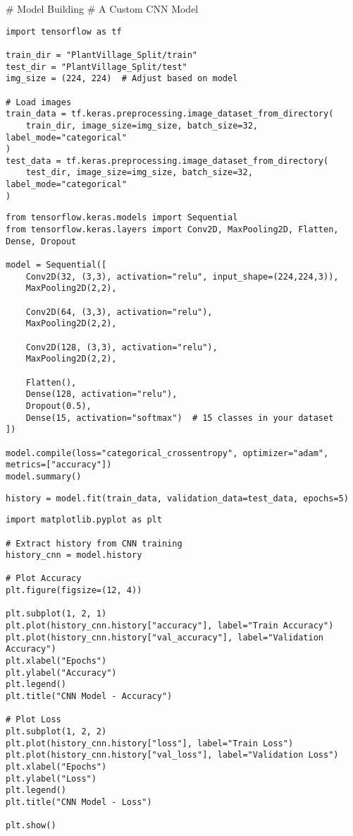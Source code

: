 \documentclass{article}
\begin{document}
\begin{lstlisting}

\end{lstlisting}
# Model Building
# A Custom CNN Model
\begin{lstlisting}
import tensorflow as tf

train_dir = "PlantVillage_Split/train"
test_dir = "PlantVillage_Split/test"
img_size = (224, 224)  # Adjust based on model

# Load images
train_data = tf.keras.preprocessing.image_dataset_from_directory(
    train_dir, image_size=img_size, batch_size=32, label_mode="categorical"
)
test_data = tf.keras.preprocessing.image_dataset_from_directory(
    test_dir, image_size=img_size, batch_size=32, label_mode="categorical"
)
\end{lstlisting}
\begin{lstlisting}
from tensorflow.keras.models import Sequential
from tensorflow.keras.layers import Conv2D, MaxPooling2D, Flatten, Dense, Dropout

model = Sequential([
    Conv2D(32, (3,3), activation="relu", input_shape=(224,224,3)),
    MaxPooling2D(2,2),

    Conv2D(64, (3,3), activation="relu"),
    MaxPooling2D(2,2),

    Conv2D(128, (3,3), activation="relu"),
    MaxPooling2D(2,2),

    Flatten(),
    Dense(128, activation="relu"),
    Dropout(0.5),
    Dense(15, activation="softmax")  # 15 classes in your dataset
])

model.compile(loss="categorical_crossentropy", optimizer="adam", metrics=["accuracy"])
model.summary()
\end{lstlisting}
\begin{lstlisting}
history = model.fit(train_data, validation_data=test_data, epochs=5)
\end{lstlisting}
\begin{lstlisting}
import matplotlib.pyplot as plt

# Extract history from CNN training
history_cnn = model.history

# Plot Accuracy
plt.figure(figsize=(12, 4))

plt.subplot(1, 2, 1)
plt.plot(history_cnn.history["accuracy"], label="Train Accuracy")
plt.plot(history_cnn.history["val_accuracy"], label="Validation Accuracy")
plt.xlabel("Epochs")
plt.ylabel("Accuracy")
plt.legend()
plt.title("CNN Model - Accuracy")

# Plot Loss
plt.subplot(1, 2, 2)
plt.plot(history_cnn.history["loss"], label="Train Loss")
plt.plot(history_cnn.history["val_loss"], label="Validation Loss")
plt.xlabel("Epochs")
plt.ylabel("Loss")
plt.legend()
plt.title("CNN Model - Loss")

plt.show()

\end{lstlisting}
\end{document}
